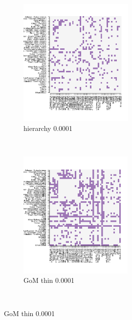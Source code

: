 \documentclass[10pt,letterpaper]{article}
\begin{document}
\begin{figure}[ht]
     \begin{subfigure}[t]{0.5\textwidth}
        \centering
        \includegraphics[height=2.5in]{../../plots/rsz_1hierarchy_F_thin_0_0001.png}
        \caption{hierarchy 0.0001}
    \end{subfigure}%
    ~
    \begin{subfigure}[t]{0.5\textwidth}
        \centering
        \includegraphics[height=2.5in]{../../plots/rsz_1admixture_F_thin_0_0001.png}
        \caption{GoM thin 0.0001}
    \end{subfigure}\\
\end{figure}
\end{document}
